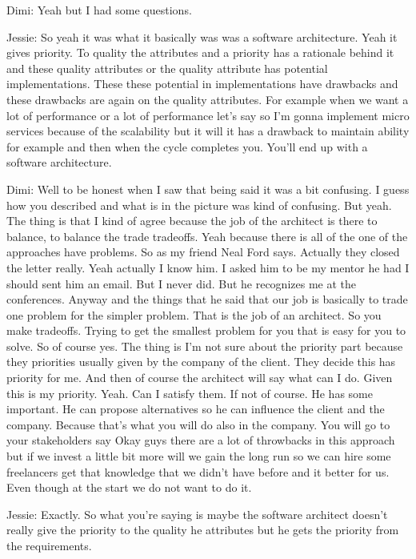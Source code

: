 Dimi: Yeah but I had some questions.

Jessie: So yeah it was what it basically was was a software architecture. Yeah it gives priority. To quality the attributes and a priority has a rationale behind it and these quality attributes or the quality attribute has potential implementations. These these potential in implementations have drawbacks and these drawbacks are again on the quality attributes. For example when we want a lot of performance or a lot of performance let's say so I'm gonna implement micro services because of the scalability but it will it has a drawback to maintain ability for example and then when the cycle completes you. You'll end up with a software architecture.

Dimi: Well to be honest when I saw that being said it was a bit confusing. I guess how you described and what is in the picture was kind of confusing. But yeah. The thing is that I kind of agree because the job of the architect is there to balance, to balance the trade tradeoffs. Yeah because there is all of the one of the approaches have problems. So as my friend Neal Ford says. Actually they closed the letter really. Yeah actually I know him. I asked him to be my mentor he had I should sent him an email. But I never did. But he recognizes me at the conferences. Anyway and the things that he said that our job is basically to trade one problem for the simpler problem. That is the job of an architect. So you make tradeoffs. Trying to get the smallest problem for you that is easy for you to solve. So of course yes. The thing is I'm not sure about the priority part because they priorities usually given by the company of the client. They decide this has priority for me. And then of course the architect will say what can I do. Given this is my priority. Yeah. Can I satisfy them. If not of course. He has some important. He can propose alternatives so he can influence the client and the company. Because that's what you will do also in the company. You will go to your stakeholders say Okay guys there are a lot of throwbacks in this approach but if we invest a little bit more will we gain the long run so we can hire some freelancers get that knowledge that we didn't have before and it better for us. Even though at the start we do not want to do it.

Jessie: Exactly. So what you're saying is maybe the software architect doesn't really give the priority to the quality he attributes but he gets the priority from the requirements.

